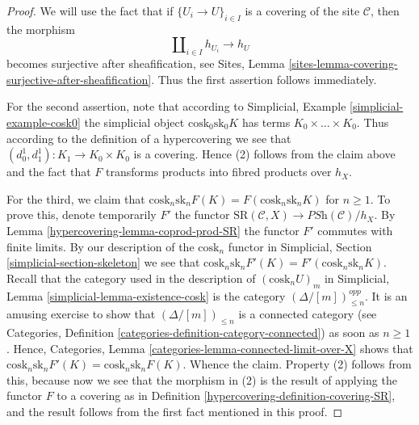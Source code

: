 \begin{proof}

We will use the fact that if
$\{U_i \to U\}_{i \in I}$ is a covering of the site
$\mathcal{C}$, then the morphism
$$
\amalg_{i \in I} h_{U_i} \to h_U
$$
becomes surjective after sheafification, see
Sites, Lemma \ref{sites-lemma-covering-surjective-after-sheafification}.
Thus the first assertion follows immediately.

\medskip\noindent
For the second assertion, note that according to
Simplicial, Example \ref{simplicial-example-cosk0}
the simplicial object $\text{cosk}_0 \text{sk}_0 K$
has terms $K_0 \times \ldots \times K_0$. Thus
according to the definition of a hypercovering we
see that $(d^1_0, d^1_1) : K_1 \to K_0 \times K_0$ is a
covering. Hence (2) follows from the claim above
and the fact that $F$ transforms products into fibred
products over $h_X$.

\medskip\noindent
For the third, we claim that
$\text{cosk}_n \text{sk}_n F(K) =
F(\text{cosk}_n \text{sk}_n K)$ for $n \geq 1$.
To prove this, denote temporarily $F'$ the functor
$\text{SR}(\mathcal{C}, X) \to \textit{PSh}(\mathcal{C})/h_X$.
By Lemma \ref{hypercovering-lemma-coprod-prod-SR} the functor
$F'$ commutes with finite limits.
By our description of the $\text{cosk}_n$ functor in
Simplicial, Section \ref{simplicial-section-skeleton}
we see that $\text{cosk}_n \text{sk}_n F'(K) =
F'(\text{cosk}_n \text{sk}_n K)$.
Recall that the category used in the description of
$(\text{cosk}_n U)_m$ in
Simplicial, Lemma \ref{simplicial-lemma-existence-cosk}
is the category $(\Delta/[m])^{opp}_{\leq n}$. It is an
amusing exercise to show that $(\Delta/[m])_{\leq n}$ is
a connected category (see
Categories, Definition \ref{categories-definition-category-connected})
as soon as $n \geq 1$. Hence,
Categories, Lemma \ref{categories-lemma-connected-limit-over-X}
shows that $\text{cosk}_n \text{sk}_n F'(K) =
\text{cosk}_n \text{sk}_n F(K)$. Whence the claim.
Property (2) follows from this, because now we see that
the morphism in (2) is the result of applying the
functor $F$ to a covering as in Definition \ref{hypercovering-definition-covering-SR},
and the result follows from the first fact mentioned
in this proof.
\end{proof}

